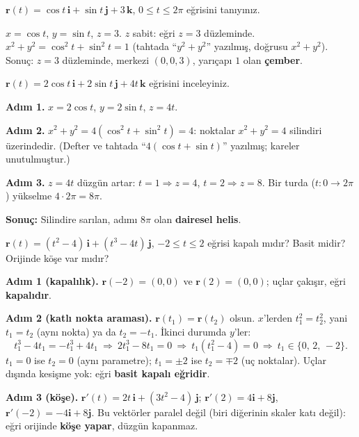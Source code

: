 \begin{soru}
$\mathbf r(t)=\cos t\,\mathbf i+\sin t\,\mathbf j+3\,\mathbf k$, $0\le t\le2\pi$ eğrisini tanıyınız.
\end{soru}
\begin{cevap}
$x=\cos t$, $y=\sin t$, $z=3$. $z$ sabit: eğri $z=3$ düzleminde. $x^2+y^2=\cos^2t+\sin^2t=1$ (tahtada ``$y^2+y^2$'' yazılmış,
doğrusu $x^2+y^2$). Sonuç: $z=3$ düzleminde, merkezi $(0,0,3)$, yarıçapı $1$ olan \textbf{çember}.
\end{cevap}

\begin{soru}
$\mathbf r(t)=2\cos t\,\mathbf i+2\sin t\,\mathbf j+4t\,\mathbf k$ eğrisini inceleyiniz.
\end{soru}
\begin{cevap}
\textbf{Adım 1.} $x=2\cos t$, $y=2\sin t$, $z=4t$.

\textbf{Adım 2.} $x^2+y^2=4(\cos^2t+\sin^2t)=4$: noktalar $x^2+y^2=4$ silindiri üzerindedir. (Defter ve tahtada
``$4(\cos t+\sin t)$'' yazılmış; kareler unutulmuştur.)

\textbf{Adım 3.} $z=4t$ düzgün artar: $t=1\Rightarrow z=4$, $t=2\Rightarrow z=8$. Bir turda ($t:0\to2\pi$) yükselme $4\cdot2\pi=8\pi$.

\textbf{Sonuç:} Silindire sarılan, adımı $8\pi$ olan \textbf{dairesel helis}.
\end{cevap}

\begin{soru}
$\mathbf r(t)=(t^2-4)\,\mathbf i+(t^3-4t)\,\mathbf j$, $-2\le t\le2$ eğrisi kapalı mıdır? Basit midir? Orijinde köşe var mıdır?
\end{soru}
\begin{cevap}
\textbf{Adım 1 (kapalılık).} $\mathbf r(-2)=(0,0)$ ve $\mathbf r(2)=(0,0)$; uçlar çakışır, eğri \textbf{kapalıdır}.

\textbf{Adım 2 (katlı nokta araması).} $\mathbf r(t_1)=\mathbf r(t_2)$ olsun. $x$'lerden $t_1^2=t_2^2$, yani $t_1=t_2$ (aynı nokta) ya da
$t_2=-t_1$. İkinci durumda $y$'ler:
\[ t_1^3-4t_1=-t_1^3+4t_1\ \Rightarrow\ 2t_1^3-8t_1=0\ \Rightarrow\ t_1(t_1^2-4)=0\ \Rightarrow\ t_1\in\{0,\,2,\,-2\}. \]
$t_1=0$ ise $t_2=0$ (aynı parametre); $t_1=\pm2$ ise $t_2=\mp2$ (uç noktalar). Uçlar dışında kesişme yok:
eğri \textbf{basit kapalı eğridir}.

\textbf{Adım 3 (köşe).} $\mathbf r'(t)=2t\,\mathbf i+(3t^2-4)\,\mathbf j$; $\mathbf r'(2)=4\mathbf i+8\mathbf j$, $\mathbf r'(-2)=-4\mathbf i+8\mathbf j$.
Bu vektörler paralel değil (biri diğerinin skaler katı değil): eğri orijinde \textbf{köşe yapar}, düzgün kapanmaz.
\end{cevap}

